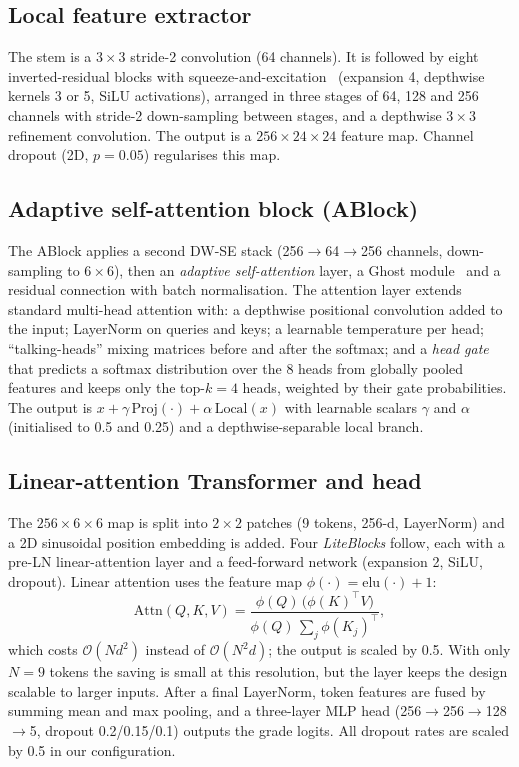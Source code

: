 \documentclass[10pt,twocolumn]{article}
\begin{document}
\subsection{Local feature extractor}
The stem is a $3{\times}3$ stride-2 convolution (64 channels). It is followed by eight inverted-residual blocks with squeeze-and-excitation~\cite{senet,mobilenetv2} (expansion 4, depthwise kernels 3 or 5, SiLU activations), arranged in three stages of 64, 128 and 256 channels with stride-2 down-sampling between stages, and a depthwise $3{\times}3$ refinement convolution. The output is a $256{\times}24{\times}24$ feature map. Channel dropout (2D, $p{=}0.05$) regularises this map.

\subsection{Adaptive self-attention block (ABlock)}
The ABlock applies a second DW-SE stack (256$\to$64$\to$256 channels, down-sampling to $6{\times}6$), then an \emph{adaptive self-attention} layer, a Ghost module~\cite{ghostnet} and a residual connection with batch normalisation. The attention layer extends standard multi-head attention with: a depthwise positional convolution added to the input; LayerNorm on queries and keys; a learnable temperature per head; ``talking-heads'' mixing matrices before and after the softmax; and a \emph{head gate} that predicts a softmax distribution over the 8 heads from globally pooled features and keeps only the top-$k{=}4$ heads, weighted by their gate probabilities. The output is $x+\gamma\,\mathrm{Proj}(\cdot)+\alpha\,\mathrm{Local}(x)$ with learnable scalars $\gamma$ and $\alpha$ (initialised to 0.5 and 0.25) and a depthwise-separable local branch.

\subsection{Linear-attention Transformer and head}
The $256{\times}6{\times}6$ map is split into $2{\times}2$ patches (9 tokens, 256-d, LayerNorm) and a 2D sinusoidal position embedding is added. Four \emph{LiteBlocks} follow, each with a pre-LN linear-attention layer and a feed-forward network (expansion 2, SiLU, dropout). Linear attention uses the feature map $\phi(\cdot)=\mathrm{elu}(\cdot)+1$:
\begin{equation}
\mathrm{Attn}(Q,K,V)=\frac{\phi(Q)\,\bigl(\phi(K)^{\top}V\bigr)}{\phi(Q)\,\sum_j\phi(K_j)^{\top}},
\end{equation}
which costs $\mathcal{O}(N d^2)$ instead of $\mathcal{O}(N^2 d)$; the output is scaled by 0.5. With only $N{=}9$ tokens the saving is small at this resolution, but the layer keeps the design scalable to larger inputs. After a final LayerNorm, token features are fused by summing mean and max pooling, and a three-layer MLP head (256$\to$256$\to$128$\to$5, dropout 0.2/0.15/0.1) outputs the grade logits. All dropout rates are scaled by 0.5 in our configuration.
\end{document}
